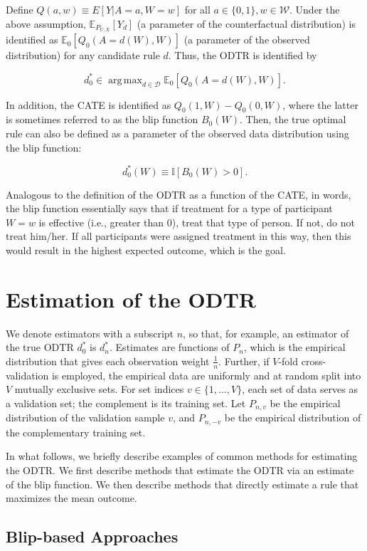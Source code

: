 \documentclass[a4paper,12pt]{article}
\DeclareMathOperator*{\argmax}{arg\,max}
\begin{document}
Define $Q(a,w)\equiv E[Y|A=a,W=w]$ for all $a \in \{0,1\}, w \in \mathcal{W}$. Under the above assumption, $\mathbb{E}_{P_{U,X}}[Y_d]$ (a parameter of the counterfactual distribution) is identified as $\mathbb{E}_0[Q_0(A=d(W), W)]$ (a parameter of the observed distribution) for any candidate rule $d$. Thus, the ODTR is identified by

\[d_0^* \in \argmax_{d \in \mathcal{D}} \mathbb{E}_0[Q_0(A=d(W), W)].\]

In addition, the CATE is identified as $Q_0(1,W)-Q_0(0,W)$, where the latter is sometimes referred to as the blip function $B_0(W)$. Then, the true optimal rule can also be defined as a parameter of the observed data distribution using the blip function:

\[d_0^*(W) \equiv \mathbb{I}[B_0 (W)>0].\]

Analogous to the definition of the ODTR as a function of the CATE, in words, the blip function essentially says that if treatment for a type of participant $W=w$ is effective (i.e., greater than 0), treat that type of person. If not, do not treat him/her. If all participants were assigned treatment in this way, then this would result in the highest expected outcome, which is the goal. 




\section{Estimation of the ODTR}

We denote estimators with a subscript $n$, so that, for example, an estimator of the true ODTR $d^*_0$ is $d^*_n$. Estimates are functions of $P_n$, which is the empirical distribution that gives each observation weight $\frac{1}{n}$. Further, if $V$-fold cross-validation is employed, the empirical data are uniformly and at random split into $V$ mutually exclusive sets. For set indices $v \in \{1,...,V\}$, each set of data serves as a validation set; the complement is its training set. Let $P_{n,v}$ be the empirical distribution of the validation sample $v$, and $P_{n,-v}$ be the empirical distribution of the complementary training set.

In what follows, we briefly describe examples of common methods for estimating the ODTR. We first describe methods that estimate the ODTR via an estimate of the blip function. We then describe methods that directly estimate a rule that maximizes the mean outcome. 

\subsection{Blip-based Approaches}
\end{document}
